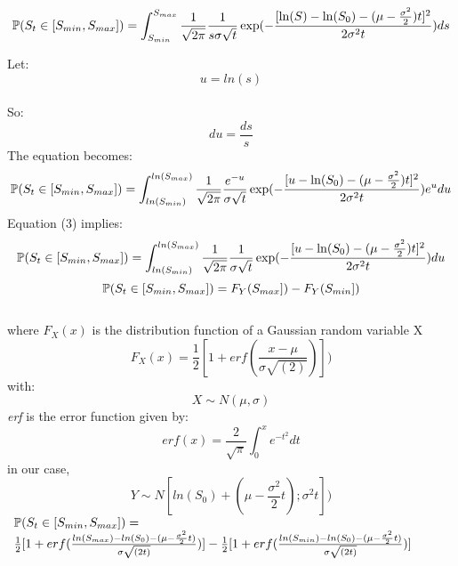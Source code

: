 \documentclass[12pt]{article}
\begin{document}
					\begin{equation}
						\mathbb{P}(S_t \in [S_{min},S_{max}]) = \int_{S_{min}}^{S_{max}} \frac{1}{\sqrt{2 \pi}} \frac{1}{s\sigma \sqrt{t}} \exp(-\frac{[\ln(S)-\ln(S_0)-
							(\mu-\frac{\sigma^2}{2})t]^2}{2 \sigma ^{2}t}) ds
					\end{equation}
					
					Let:  $$u = ln(s)$$\\
					So:  $$du = \frac{ds}{s}$$
					The equation becomes:
					\begin{equation}
					\mathbb{P}(S_t \in [S_{min},S_{max}]) = \int_{ln(S_{min})}^{ln(S_{max})} \frac{1}{\sqrt{2 \pi}} \frac{e^{-u}}{\sigma \sqrt{t}} \exp(-\frac{[u-\ln(S_0)-
						(\mu-\frac{\sigma^2}{2})t]^2}{2 \sigma ^{2}t}) e^{u}du
					\end{equation}
					Equation (3) implies:
					\begin{equation}
					\mathbb{P}(S_t \in [S_{min},S_{max}]) = \int_{ln(S_{min})}^{ln(S_{max})} \frac{1}{\sqrt{2 \pi}} \frac{1}{\sigma \sqrt{t}} \exp(-\frac{[u-\ln(S_0)-
						(\mu-\frac{\sigma^2}{2})t]^2}{2 \sigma ^{2}t}) du
					\end{equation}
					\begin{equation}
					\mathbb{P}(S_t \in [S_{min},S_{max}]) = F_{Y}(S_{max}]) - F_{Y}(S_{min}])
					\end{equation}
					\\
					where $F_{X}(x)$ is the distribution function of a Gaussian random variable X
					\begin{equation}
					F_{X}(x) = \frac{1}{2}[1 + erf(\frac{x - \mu}{\sigma \sqrt{(2)}})])
					\end{equation}
					with:
					 $$X \sim N(\mu,\sigma)$$
					{\it erf} is the error function given by:
					\begin{equation}
					erf(x) = \frac{2}{\sqrt{\pi}} \int_{0}^{x} e^{-t^{2}} dt
					\end{equation}
					in our case,
					\begin{equation}
					 Y \sim N[ln(S_{0}) + (\mu - \frac{\sigma^{2}}{2}t) ; \sigma^{2}t])
 					\end{equation}
 					$\begin{array}{lcl}
 						\mathbb{P}(S_t \in [S_{min},S_{max}]) =\\ \frac{1}{2}[1+erf(\frac{ln(S_{max})-ln(S_0)-(\mu-\frac{\sigma^2}{2}t)}{\sigma \sqrt{(2t)}})]-\frac{1}{2}[1+erf(\frac{ln(S_{min})-ln(S_0)-(\mu-\frac{\sigma^2}{2}t)}{\sigma \sqrt{(2t)}})]
 					\end{array}$
 				
\end{document}
